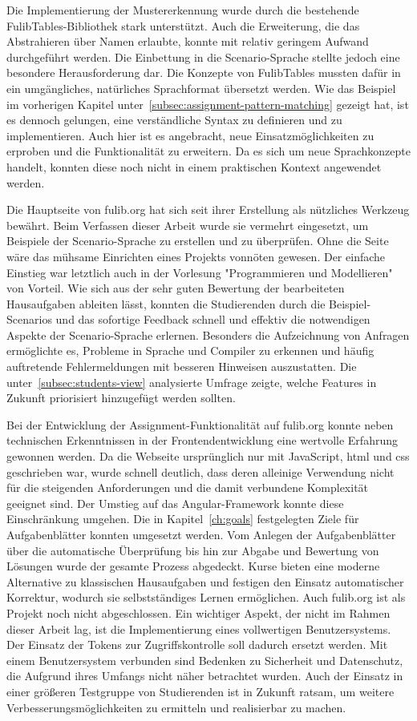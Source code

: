 Die Implementierung der Mustererkennung wurde durch die bestehende FulibTables-Bibliothek stark unterstützt.
Auch die Erweiterung, die das Abstrahieren über Namen erlaubte, konnte mit relativ geringem Aufwand durchgeführt werden.
Die Einbettung in die Scenario-Sprache stellte jedoch eine besondere Herausforderung dar.
Die Konzepte von FulibTables mussten dafür in ein umgängliches, natürliches Sprachformat übersetzt werden.
Wie das Beispiel im vorherigen Kapitel unter~\ref{subsec:assignment-pattern-matching} gezeigt hat, ist es dennoch gelungen, eine verständliche Syntax zu definieren und zu implementieren.
Auch hier ist es angebracht, neue Einsatzmöglichkeiten zu erproben und die Funktionalität zu erweitern.
Da es sich um neue Sprachkonzepte handelt, konnten diese noch nicht in einem praktischen Kontext angewendet werden.

Die Hauptseite von fulib.org hat sich seit ihrer Erstellung als nützliches Werkzeug bewährt.
Beim Verfassen dieser Arbeit wurde sie vermehrt eingesetzt, um Beispiele der Scenario-Sprache zu erstellen und zu überprüfen.
Ohne die Seite wäre das mühsame Einrichten eines Projekts vonnöten gewesen.
Der einfache Einstieg war letztlich auch in der Vorlesung "Programmieren und Modellieren" von Vorteil.
Wie sich aus der sehr guten Bewertung der bearbeiteten Hausaufgaben ableiten lässt, konnten die Studierenden durch die Beispiel-Scenarios und das sofortige Feedback schnell und effektiv die notwendigen Aspekte der Scenario-Sprache erlernen.
Besonders die Aufzeichnung von Anfragen ermöglichte es, Probleme in Sprache und Compiler zu erkennen und häufig auftretende Fehlermeldungen mit besseren Hinweisen auszustatten.
Die unter~\ref{subsec:students-view} analysierte Umfrage zeigte, welche Features in Zukunft priorisiert hinzugefügt werden sollten.

Bei der Entwicklung der Assignment-Funktionalität auf fulib.org konnte neben technischen Erkenntnissen in der Frontendentwicklung eine wertvolle Erfahrung gewonnen werden.
Da die Webseite ursprünglich nur mit JavaScript, \ac{html} und \ac{css} geschrieben war, wurde schnell deutlich, dass deren alleinige Verwendung nicht für die steigenden Anforderungen und die damit verbundene Komplexität geeignet sind.
Der Umstieg auf das Angular-Framework konnte diese Einschränkung umgehen.
Die in Kapitel~\ref{ch:goals} festgelegten Ziele für Aufgabenblätter konnten umgesetzt werden.
Vom Anlegen der Aufgabenblätter über die automatische Überprüfung bis hin zur Abgabe und Bewertung von Lösungen wurde der gesamte Prozess abgedeckt.
Kurse bieten eine moderne Alternative zu klassischen Hausaufgaben und festigen den Einsatz automatischer Korrektur, wodurch sie selbstständiges Lernen ermöglichen.
Auch fulib.org ist als Projekt noch nicht abgeschlossen.
Ein wichtiger Aspekt, der nicht im Rahmen dieser Arbeit lag, ist die Implementierung eines vollwertigen Benutzersystems.
Der Einsatz der Tokens zur Zugriffskontrolle soll dadurch ersetzt werden.
Mit einem Benutzersystem verbunden sind Bedenken zu Sicherheit und Datenschutz, die Aufgrund ihres Umfangs nicht näher betrachtet wurden.
Auch der Einsatz in einer größeren Testgruppe von Studierenden ist in Zukunft ratsam, um weitere Verbesserungsmöglichkeiten zu ermitteln und realisierbar zu machen.
